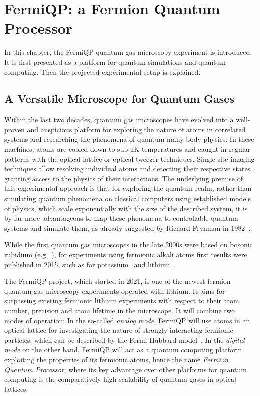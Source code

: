 \renewcommand{\imagepath}{../20-fermiqp/img}

\chapter{FermiQP: a Fermion Quantum Processor}
In this chapter, the FermiQP quantum gas microscopy experiment is introduced. It is first presented as a platform for quantum simulations and quantum computing. Then the projected experimental setup is explained.

\section{A Versatile Microscope for Quantum Gases}
Within the last two decades, quantum gas microscopes have evolved into a well-proven and auspicious platform for exploring the nature of atoms in correlated systems and researching the phenomena of quantum many-body physics. In these machines, atoms are cooled down to sub \si[]{\micro\kelvin}  temperatures and caught in regular patterns with the optical lattice or optical tweezer techniques. Single-site imaging techniques allow resolving individual atoms and detecting their respective states~\cite{bloch_many-body_2008,gross_quantum_2017, gross_quantum_2021}, granting access to the physics of their interactions. The underlying premise of this experimental approach is that for exploring the quantum realm, rather than simulating quantum phenomena on classical computers using established models of physics, which scale exponentially with the size of the described system, it is by far more advantageous to map these phenomena to controllable quantum systems and simulate them, as already suggested by Richard Feynman in 1982~\cite{feynman_simulating_1982}.

While the first quantum gas microscopes in the late 2000s were based on bosonic rubidium (e.g.~\cite{sherson_single-atom-resolved_2010}), for experiments using fermionic alkali atoms  first results were published in 2015, such as for potassium~\cite{cheuk_quantum-gas_2015} and lithium \cite{parsons_site-resolved_2015, omran_microscopic_2015}.

The FermiQP project, which started in 2021, is one of the newest fermion quantum gas microscopy experiments operated with lithium. It aims for surpassing existing fermionic lithium experiments with respect to their atom number, precision and atom lifetime in the microscope. It will combine two modes of operation: In the so-called \textit{analog mode}, FermiQP will use atoms in an optical lattice for investigating the nature of strongly interacting fermionic particles, which can be described by the Fermi-Hubbard model~\cite{hubbard_electron_1963, esslinger_fermi-hubbard_2010}. In the \textit{digital mode} on the other hand, FermiQP will act as a quantum computing platform exploiting the properties of its fermionic atoms, hence the name \textit{Fermion Quantum Processor}, where its key advantage over other platforms for quantum computing is the comparatively high scalability of quantum gases in optical lattices.

